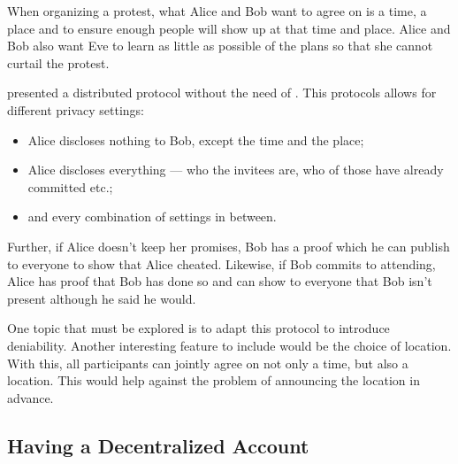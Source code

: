 When organizing a protest, what Alice and Bob want to agree on is a time, 
a place and to ensure enough people will show up at that time and place.
Alice and Bob also want Eve to learn as little as possible of the plans so 
that she cannot curtail the protest.

\citet{EventsInvitations} presented a distributed protocol without the need of 
.
This protocols allows for different privacy settings:
\begin{itemize}
\item Alice discloses nothing to Bob, except the time and the place;
\item Alice discloses everything --- who the invitees are, who of those have 
  already committed etc.;
\item and every combination of settings in between.
\end{itemize}
Further, if Alice doesn't keep her promises, Bob has a proof which he can 
publish to everyone to show that Alice cheated.
Likewise, if Bob commits to attending, Alice has proof that Bob has done so and 
can show to everyone that Bob isn't present although he said he would.

One topic that must be explored is to adapt this protocol to introduce 
deniability.
Another interesting feature to include would be the choice of location.
With this, all participants can jointly agree on not only a time, but also 
a location.
This would help against the problem of announcing the location in advance.



\subsection{Having a Decentralized Account}
\label{passwd}

